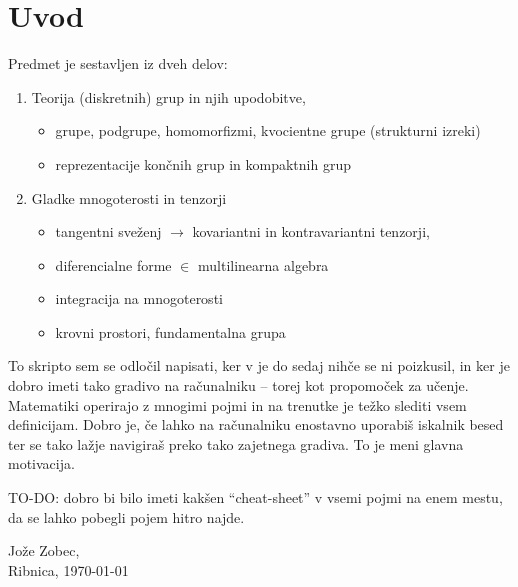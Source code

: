 \chapter*{Uvod}

Predmet je sestavljen iz dveh delov:
\begin{enumerate}
	\item{Teorija (diskretnih) grup in njih upodobitve,}
		\begin{itemize}
			\item{grupe, podgrupe, homomorfizmi, kvocientne grupe (strukturni izreki)}
			\item{reprezentacije kon\v cnih grup in kompaktnih grup}
		\end{itemize}
	\item{Gladke mnogoterosti in tenzorji}
		\begin{itemize}
			\item{tangentni sve\v zenj $\to$ kovariantni in kontravariantni tenzorji,}
			\item{diferencialne forme $\in$ multilinearna algebra}
			\item{integracija na mnogoterosti}
			\item{krovni prostori, fundamentalna grupa}
		\end{itemize}
\end{enumerate}

To skripto sem se odlo\v cil napisati, ker v je do sedaj nih\v ce se ni poizkusil, in ker je dobro
imeti tako gradivo na ra\v cunalniku -- torej kot propomo\v cek za u\v cenje. Matematiki operirajo z
mnogimi pojmi in na trenutke je te\v zko slediti vsem definicijam. Dobro je, \v ce lahko na ra\v cunalniku
enostavno uporabi\v s iskalnik besed ter se tako la\v zje navigira\v s preko tako zajetnega gradiva.
To je meni glavna motivacija.

\textsc{TO-DO:} dobro bi bilo imeti kak\v sen "`cheat-sheet"' v vsemi pojmi na enem mestu, da se lahko
pobegli pojem hitro najde.

\begin{flushright}
Jo\v ze Zobec,\\[0.5cm]
Ribnica, \today
\end{flushright}
